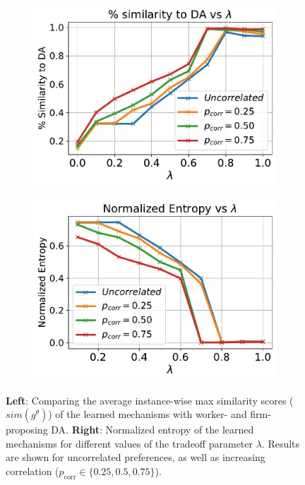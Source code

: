 \documentclass[11pt,letterpaper]{article}
\theoremstyle{definition}
\begin{document}
\begin{figure}
\centering
\begin{subfigure}[b]{0.49\textwidth}
\centering
\includegraphics[scale=0.5]{plots/DA_sim.pdf}
\end{subfigure}
\begin{subfigure}[b]{0.49\textwidth}
\centering
\includegraphics[scale=0.5]{plots/EN.pdf}
\end{subfigure}
\caption{\label{fig:props} \textbf{Left}: Comparing the average instance-wise max similarity scores ($\mathit{sim}(g^\theta)$) of the learned mechanisms with worker- and firm-proposing DA. \textbf{Right}:  Normalized entropy of the learned mechanisms for different values of the tradeoff parameter $\lambda$. 
Results are shown for uncorrelated preferences, as well as increasing correlation ($p_{\mathrm{corr}}\in \{0.25, 0.5, 0.75\}$).}
\vspace{-10pt}
\end{figure}
\end{document}

